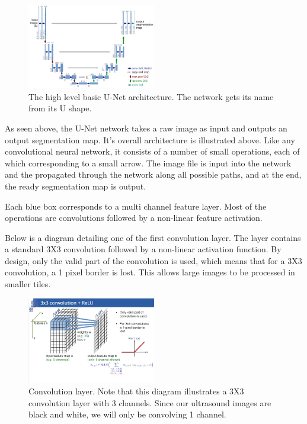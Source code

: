 \documentclass[letterpaper]{article}
\begin{document}
 \begin{figure}[H]
  \centerline{\includegraphics[width=0.5\textwidth]{Images/UNET.png}}
  \caption{The high level basic U-Net architecture. The network gets its name from its U shape.}
  \label{fig:unet}
\end{figure}

As seen above, the U-Net network takes a raw image as input and outputs an output segmentation map. 
It's overall architecture is illustrated above. Like any convolutional neural network, it consists of a number of small operations, each of which corresponding to a small arrow. The image file is input into the network and the propagated through the network along all possible paths,  and at the end, the ready segmentation map is output.

Each blue box corresponds to a multi channel feature layer. Most of the operations are convolutions followed by a non-linear feature activation. 

Below is a diagram detailing one of the first convolution layer. The layer contains a standard 3X3 convolution followed by a non-linear activation function. By design, only the valid part of the convolution is used, which means that for a 3X3 convolution, a 1 pixel border is lost. This allows large images to be processed in smaller tiles. 	

 \begin{figure}[H]
  \centerline{\includegraphics[width=0.5\textwidth]{Images/UNET1.png}}
  \caption{Convolution layer. Note that this diagram illustrates a 3X3 convolution layer with 3 channels. Since our ultrasound images are black and white, we will only be convolving 1 channel.}
  \label{fig:unet1}
\end{figure}
\end{document}
